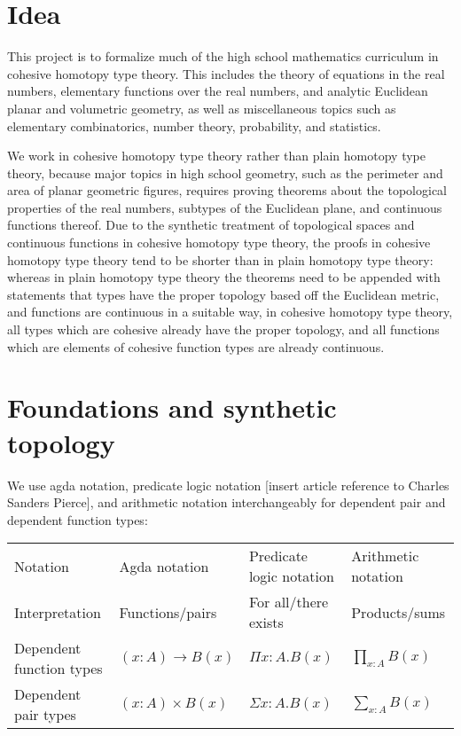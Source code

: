 \documentclass[one]{article}
\begin{document}
\tableofcontents

\section{Idea}

This project is to formalize much of the high school mathematics curriculum in cohesive homotopy type theory. This includes the theory of equations in the real numbers, elementary functions over the real numbers, and analytic Euclidean planar and volumetric geometry, as well as miscellaneous topics such as elementary combinatorics, number theory, probability, and statistics. 

We work in cohesive homotopy type theory rather than plain homotopy type theory, because major topics in high school geometry, such as the perimeter and area of planar geometric figures, requires proving theorems about the topological properties of the real numbers, subtypes of the Euclidean plane, and continuous functions thereof. Due to the synthetic treatment of topological spaces and continuous functions in cohesive homotopy type theory, the proofs in cohesive homotopy type theory tend to be shorter than in plain homotopy type theory: whereas in plain homotopy type theory the theorems need to be appended with statements that types have the proper topology based off the Euclidean metric, and functions are continuous in a suitable way, in cohesive homotopy type theory, all types which are cohesive already have the proper topology, and all functions which are elements of cohesive function types are already continuous. 

\section{Foundations and synthetic topology}

We use agda notation, predicate logic notation [insert article reference to Charles Sanders Pierce], and arithmetic notation interchangeably for dependent pair and dependent function types: 

\begin{table}
\centering
\begin{tabular}{llll}
Notation                & Agda notation                          & Predicate logic notation             & Arithmetic notation                     \\
Interpretation           & Functions/pairs      & For all/there exists    &   Products/sums            \\
Dependent function types & $(x : A) \to B(x)$    & $\Pi x:A.B(x)$    & $\prod_{x:A} B(x)$  \\
Dependent pair types     & $(x : A) \times B(x)$ & $\Sigma x:A.B(x)$ & $\sum_{x:A} B(x)$   \\                 
\end{tabular}
\end{table}
\end{document}
